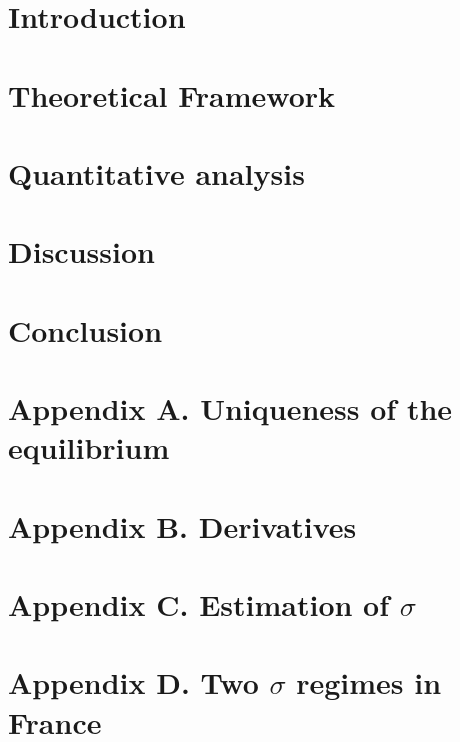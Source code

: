 \documentclass[12pt]{article}
\begin{document}
	\section{Introduction} \label{sec:introduction}
	
	
	\section{Theoretical Framework} \label{sec:model}
	
	
	\section{Quantitative analysis} \label{sec:quantitative_analysis}
	
	
	\section{Discussion} \label{sec:discussion}
	
	
	\section{Conclusion} \label{sec:conclusion}
	
	
	\clearpage
	\setlength\bibsep{0pt}
	
	
	
	\clearpage
	\onehalfspacing
	\appendix
	
	\section*{Appendix A. Uniqueness of the equilibrium} \label{appendix:uniqueness}
	
	
	\section*{Appendix B. Derivatives} \label{appendix:derivatives}
	

	\section*{Appendix C. Estimation of $\sigma$} \label{appendix:sigma}
	
	
	\section*{Appendix D. Two $\sigma$ regimes in France} \label{appendix:regime}
	
	
	
\end{document}
